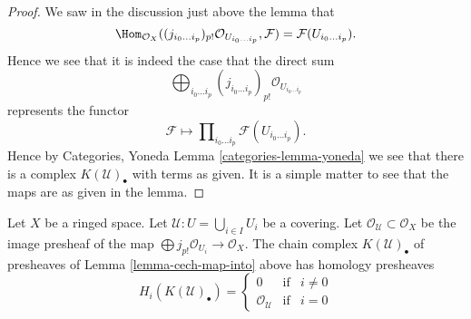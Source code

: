 \begin{proof}
We saw in the discussion just above the lemma that
$$
\Hom_{\mathcal{O}_X}(
(j_{i_0\ldots i_p})_{p!}\mathcal{O}_{U_{i_0\ldots i_p}},
\mathcal{F})
=
\mathcal{F}(U_{i_0\ldots i_p}).
$$
Hence we see that it is indeed the case that the direct sum
$$
\bigoplus\nolimits_{i_0 \ldots i_p}
(j_{i_0 \ldots i_p})_{p!}\mathcal{O}_{U_{i_0 \ldots i_p}}
$$
represents the functor
$$
\mathcal{F}
\longmapsto
\prod\nolimits_{i_0\ldots i_p} \mathcal{F}(U_{i_0\ldots i_p}).
$$
Hence by Categories, Yoneda Lemma \ref{categories-lemma-yoneda}
we see that there is a complex $K(\mathcal{U})_\bullet$ with terms
as given. It is a simple matter to see that the maps are as given
in the lemma.
\end{proof}

\begin{lemma}
\label{lemma-homology-complex}
Let $X$ be a ringed space.
Let $\mathcal{U} : U = \bigcup_{i \in I} U_i$ be a covering.
Let $\mathcal{O}_\mathcal{U} \subset \mathcal{O}_X$
be the image presheaf of the map
$\bigoplus j_{p!}\mathcal{O}_{U_i} \to \mathcal{O}_X$.
The chain complex $K(\mathcal{U})_\bullet$ of presheaves
of Lemma \ref{lemma-cech-map-into} above has homology presheaves
$$
H_i(K(\mathcal{U})_\bullet) =
\left\{
\begin{matrix}
0 & \text{if} & i \not = 0 \\
\mathcal{O}_\mathcal{U} & \text{if} & i = 0
\end{matrix}
\right.
$$
\end{lemma}

